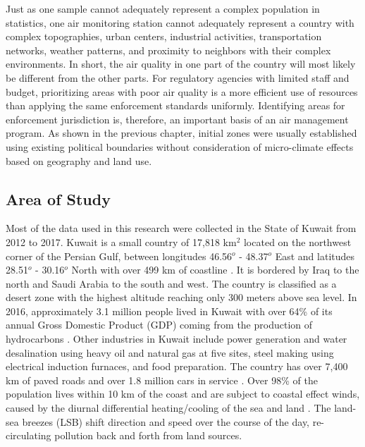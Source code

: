 Just as one sample cannot adequately represent a complex population in statistics, one air monitoring station cannot adequately represent a country with complex topographies, urban centers, industrial activities, transportation networks, weather patterns, and proximity to neighbors with their complex environments.  In short, the air quality in one part of the country will most likely be different from the other parts. For regulatory agencies with limited staff and budget, prioritizing areas with poor air quality is a more efficient use of resources than applying the same enforcement standards uniformly. Identifying areas for enforcement jurisdiction is, therefore, an important basis of an air management program. As shown in the previous chapter, initial zones were usually established using existing political boundaries without consideration of micro-climate effects based on geography and land use.  

\subsection{Area of Study}

Most of the data used in this research were collected in the State of Kuwait from 2012 to 2017. Kuwait is a small country of 17,818 km$^{2}$ located on the northwest corner of the Persian Gulf, between longitudes 46.56$^{o}$ - 48.37$^{o}$ East and latitudes 28.51$^{o}$ - 30.16$^{o}$ North with over 499 km of coastline \citep{CIA2015}. It is bordered by Iraq to the north and Saudi Arabia to the south and west. The country is classified as a desert zone with the highest altitude reaching only 300 meters above sea level.   In 2016, approximately 3.1 million people lived in Kuwait \citep{CSB2017} with over 64\% of its annual Gross Domestic Product (GDP) coming from the production of hydrocarbons \citep{KAMCO2013}.  Other industries in Kuwait include power generation and water desalination using heavy oil and natural gas at five sites, steel making using electrical induction furnaces, and food preparation.  The country has over 7,400 km of paved roads and over 1.8 million cars in service \citep{CSB2014}.  Over 98\% of the population lives within 10 km of the coast and are subject to coastal effect winds, caused by the diurnal differential heating/cooling of the sea and land \citep{Crosman2010, Cuxart2014}.  The land-sea breezes (LSB) shift direction and speed over the course of the day, re-circulating pollution back and forth from land sources.

